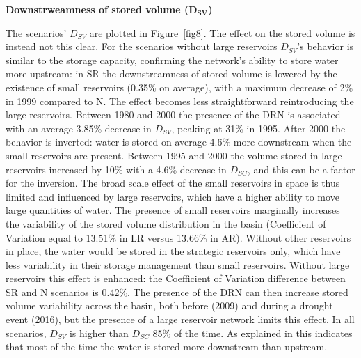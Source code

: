 \documentclass[draft]{agujournal2019}
\begin{document}
\textbf{Downstrweamness of stored volume ($\bm{D_{SV}}$)}

The scenarios’ $D_{SV}$ are plotted in Figure~\ref{fig8}. The effect on the stored volume is instead not this clear. For the scenarios without large reservoirs $D_{SV}$’s behavior is similar to the storage capacity, confirming the network’s ability to store water more upstream: in SR the downstreamness of stored volume is lowered by the existence of small reservoirs (0.35\% on average), with a maximum decrease of 2\% in 1999 compared to N. The effect becomes less straightforward reintroducing the large reservoirs. Between 1980 and 2000 the presence of the DRN is associated with an average 3.85\% decrease in $D_{SV}$, peaking at 31\% in 1995. After 2000 the behavior is inverted: water is stored on average 4.6\% more downstream when the small reservoirs are present. Between 1995 and 2000 the volume stored in large reservoirs increased by 10\% with a 4.6\% decrease in $D_{SC}$, and this can be a factor for the inversion. The broad scale effect of the small reservoirs in space is thus limited and influenced by large reservoirs, which have a higher ability to move large quantities of water. The presence of small reservoirs marginally increases the variability of the stored volume distribution in the basin (Coefficient of Variation equal to 13.51\% in LR versus 13.66\% in AR). Without other reservoirs in place, the water would be stored in the strategic reservoirs only, which have less variability in their storage management than small reservoirs. Without large reservoirs this effect is enhanced: the Coefficient of Variation difference between SR and N scenarios is 0.42\%. The presence of the DRN can then increase stored volume variability across the basin, both before (2009) and during a drought event (2016), but the presence of a large reservoir network limits this effect. In all scenarios, $D_{SV}$ is higher than $D_{SC}$ 85\% of the time. As explained in  this indicates that most of the time the water is stored more downstream than upstream.\\
\end{document}
